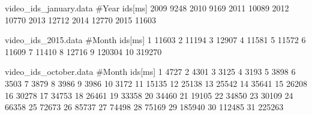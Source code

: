 \usepackage{tikz}
\usetikzlibrary{plotmarks}

\begin{filecontents}{video_ids_january.data}
#Year       ids[ms]
2009        9248
2010        9169
2011        10089
2012        10770
2013        12712
2014        12770
2015        11603
\end{filecontents}

\begin{filecontents}{video_ids_2015.data}
#Month  ids[ms]
1       11603
2       11194
3       12907
4       11581
5       11572
6       11609
7       11410
8       12716
9       120304
10      319270
\end{filecontents}

\begin{filecontents}{video_ids_october.data}
#Month  ids[ms]
1       4727
2       4301
3       3125
4       3193
5       3898
6       3503
7       3879
8       3986
9       3986
10      3172
11      15135
12      25138
13      25542
14      35641
15      26208
16      30278
17      34753
18      26461
19      33358
20      34460
21      19105
22      34850
23      30109
24      66358
25      72673    
26      85737
27      74498
28      75169
29      185940
30      112485
31      225263
\end{filecontents}

